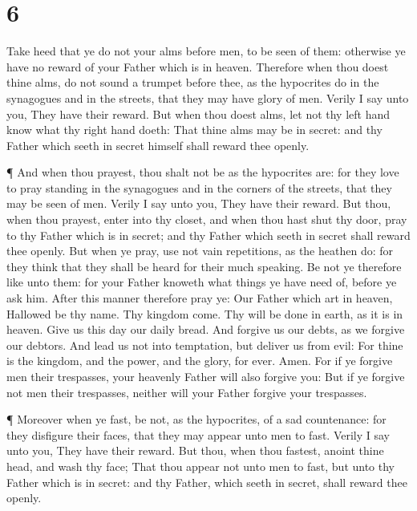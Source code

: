 \hypertarget{section-5}{%
\section{6}\label{section-5}}

 Take heed that ye do not your alms before men, to be seen
of them: otherwise ye have no reward of your Father which is in heaven.
 Therefore when thou doest thine alms, do not sound a
trumpet before thee, as the hypocrites do in the synagogues and in the
streets, that they may have glory of men. Verily I say unto you, They
have their reward.  But when thou doest alms, let not thy
left hand know what thy right hand doeth:  That thine alms
may be in secret: and thy Father which seeth in secret himself shall
reward thee openly.

 ¶ And when thou prayest, thou shalt not be as the
hypocrites are: for they love to pray standing in the synagogues and in
the corners of the streets, that they may be seen of men. Verily I say
unto you, They have their reward.  But thou, when thou
prayest, enter into thy closet, and when thou hast shut thy door, pray
to thy Father which is in secret; and thy Father which seeth in secret
shall reward thee openly.  But when ye pray, use not vain
repetitions, as the heathen do: for they think that they shall be heard
for their much speaking.  Be not ye therefore like unto
them: for your Father knoweth what things ye have need of, before ye ask
him.  After this manner therefore pray ye: Our Father which
art in heaven, Hallowed be thy name.  Thy kingdom come. Thy
will be done in earth, as it is in heaven.  Give us this
day our daily bread.  And forgive us our debts, as we
forgive our debtors.  And lead us not into temptation, but
deliver us from evil: For thine is the kingdom, and the power, and the
glory, for ever. Amen.  For if ye forgive men their
trespasses, your heavenly Father will also forgive you: 
But if ye forgive not men their trespasses, neither will your Father
forgive your trespasses.

 ¶ Moreover when ye fast, be not, as the hypocrites, of a
sad countenance: for they disfigure their faces, that they may appear
unto men to fast. Verily I say unto you, They have their reward.
 But thou, when thou fastest, anoint thine head, and wash
thy face;  That thou appear not unto men to fast, but unto
thy Father which is in secret: and thy Father, which seeth in secret,
shall reward thee openly.

